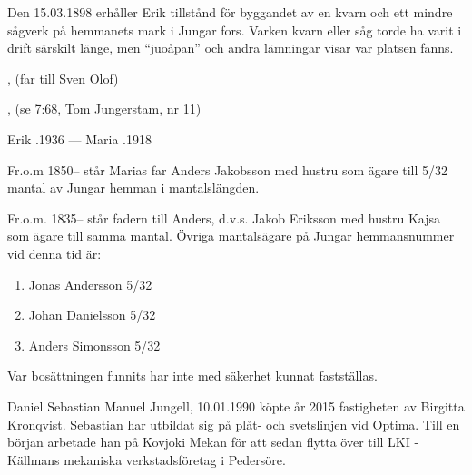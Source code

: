 Den 15.03.1898 erhåller Erik tillstånd för byggandet av en kvarn och ett mindre sågverk på hemmanets mark i Jungar fors. Varken kvarn eller såg torde ha varit i drift särskilt länge, men ``juoåpan'' och andra lämningar visar var platsen fanns.
\begin{jhchildren}
  \item {}
  \item {}
  \item {}, (far till Sven Olof)
  \item {}, (se 7:68, Tom Jungerstam, nr 11)
  \item {}
  \item {}
\end{jhchildren}

Erik .1936  ---  Maria .1918

Fr.o.m 1850-- står Marias far Anders Jakobsson med hustru som ägare till 5/32 mantal av Jungar hemman i mantalslängden.

Fr.o.m. 1835-- står fadern till Anders, d.v.s. Jakob Eriksson med hustru Kajsa som ägare till samma mantal. Övriga mantalsägare på Jungar hemmansnummer vid denna tid är:
\begin{enumerate}
  \item Jonas Andersson 5/32
  \item Johan Danielsson 5/32
  \item Anders Simonsson 5/32
\end{enumerate}

Var bosättningen funnits har inte med säkerhet kunnat fastställas.






Daniel Sebastian Manuel Jungell, 10.01.1990 köpte år 2015 fastigheten av Birgitta Kronqvist. Sebastian har utbildat sig på plåt- och svetslinjen vid Optima. Till en början arbetade han på Kovjoki Mekan för att sedan flytta över till LKI -Källmans mekaniska verkstadsföretag i Pedersöre.



